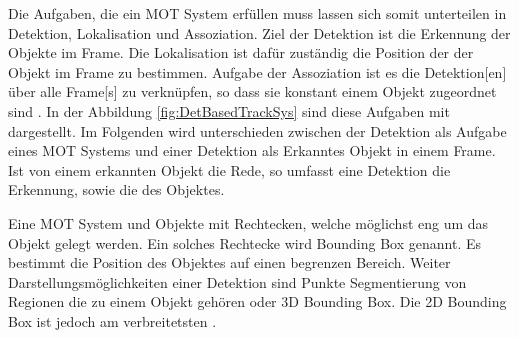Die Aufgaben, die ein \gls{MOT} System erfüllen muss lassen sich somit unterteilen in \gls{Detektion}, \gls{Lokalisation} und \gls{Assoziation}. Ziel der \gls{Detektion} ist die Erkennung der Objekte im \gls{Frame}. Die \gls{Lokalisation} ist dafür zuständig die Position der der Objekt im \gls{Frame} zu bestimmen. Aufgabe der \gls{Assoziation} ist es die \gls{Detektion}[en] über alle \gls{Frame}[s] zu verknüpfen, so dass sie konstant einem Objekt zugeordnet sind \cite{CLEAR.2008, HOTA}. In der Abbildung \ref{fig:DetBasedTrackSys} sind diese Aufgaben mit dargestellt. Im Folgenden wird unterschieden zwischen der \gls{Detektion} als Aufgabe eines \gls{MOT} Systems und einer \gls{Detektion} als Erkanntes Objekt in einem \gls{Frame}. Ist von einem erkannten Objekt die Rede, so umfasst eine \gls{Detektion} die Erkennung, sowie die  des Objektes. \par

Eine \gls{MOT} System  und  Objekte mit Rechtecken, welche möglichst eng um das Objekt gelegt werden. Ein solches Rechtecke wird \gls{Bounding Box} genannt. Es bestimmt die Position des Objektes auf einen begrenzen Bereich. Weiter Darstellungsmöglichkeiten einer \gls{Detektion} sind Punkte Segmentierung von Regionen die zu einem Objekt gehören oder 3D \gls{Bounding Box}. Die 2D \gls{Bounding Box} ist jedoch am verbreitetsten \cite{MOT15, HOTA, Luo.2022}. \par 

